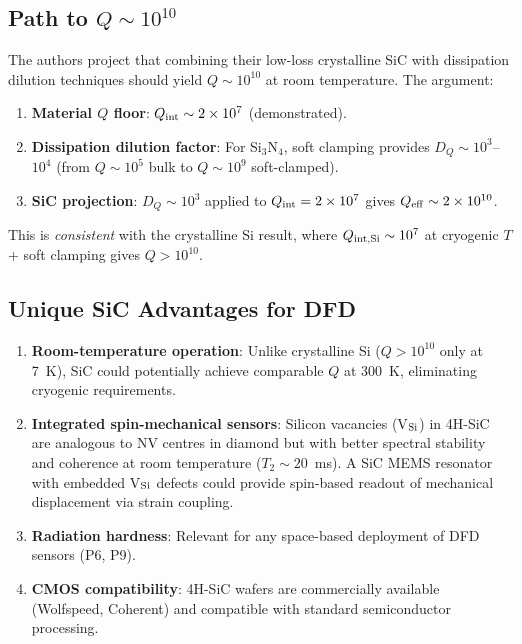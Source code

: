 \documentclass[11pt]{article}
\theoremstyle{definition}
\theoremstyle{remark}
\newcommand{\ee}[1]{\times 10^{#1}}
\begin{document}
\subsection{Path to $Q \sim 10^{10}$}

The authors project that combining their low-loss crystalline SiC
with dissipation dilution techniques should yield $Q \sim 10^{10}$
at room temperature. The argument:

\begin{enumerate}[nosep]
\item \textbf{Material $Q$ floor}: $Q_{\rm int} \sim 2\ee{7}$ (demonstrated).
\item \textbf{Dissipation dilution factor}: For Si$_3$N$_4$, soft
  clamping provides $D_Q \sim 10^3$--$10^4$ (from $Q \sim 10^5$
  bulk to $Q \sim 10^9$ soft-clamped).
\item \textbf{SiC projection}: $D_Q \sim 10^3$ applied to
  $Q_{\rm int} = 2\ee{7}$ gives $Q_{\rm eff} \sim 2\ee{10}$.
\end{enumerate}

This is \textit{consistent} with the crystalline Si result, where
$Q_{\rm int,Si} \sim 10^7$ at cryogenic $T$ + soft clamping gives
$Q > 10^{10}$.

\subsection{Unique SiC Advantages for DFD}

\begin{enumerate}[nosep]
\item \textbf{Room-temperature operation}: Unlike crystalline Si
  ($Q > 10^{10}$ only at 7~K), SiC could potentially achieve
  comparable $Q$ at 300~K, eliminating cryogenic requirements.

\item \textbf{Integrated spin-mechanical sensors}: Silicon vacancies
  (V$_{\rm Si}$) in 4H-SiC are analogous to NV centres in diamond
  but with better spectral stability and coherence at room
  temperature ($T_2 \sim 20$~ms). A SiC MEMS resonator with
  embedded V$_{\rm Si}$ defects could provide spin-based readout
  of mechanical displacement via strain coupling.

\item \textbf{Radiation hardness}: Relevant for any space-based
  deployment of DFD sensors (P6, P9).

\item \textbf{CMOS compatibility}: 4H-SiC wafers are commercially
  available (Wolfspeed, Coherent) and compatible with standard
  semiconductor processing.
\end{enumerate}
\end{document}
